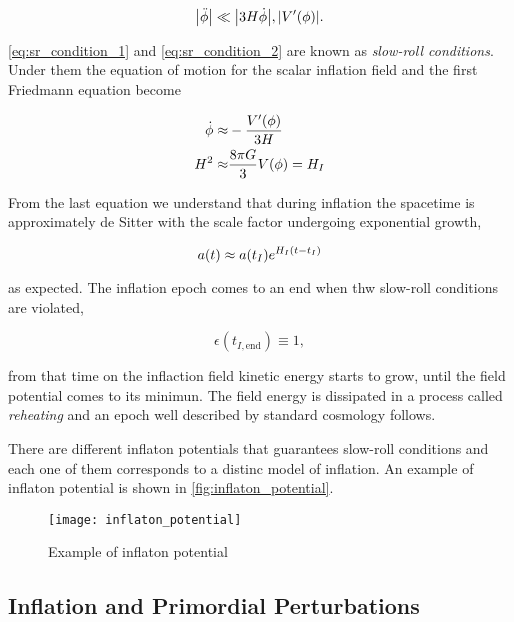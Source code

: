 \begin{equation}
        \abs{\ddot\phi} \ll \abs{3H\dot\phi}, \abs{V'\qty(\phi)}.
        \label{eq:sr_condition_2}
\end{equation}

\autoref{eq:sr_condition_1} and \autoref{eq:sr_condition_2} are known as
\emph{slow-roll conditions}. Under them the equation of motion for the
scalar inflation field and the first Friedmann equation become

\begin{align}
        \dot\phi \approx & -\frac{V'\qty(\phi)}{3H}  \\
        H^2 \approx & \frac{8\pi G}{3} V\qty(\phi) = H_I
\end{align}

From the last equation we understand that during inflation the spacetime is
approximately de Sitter with the scale factor undergoing exponential growth,

\begin{equation}
        a\qty(t) \approx a\qty(t_I)e^{H_I\qty(t - t_I)}
\end{equation}

as expected. The inflation epoch comes to an end when thw slow-roll
conditions are violated,

\begin{equation}
        \epsilon(t_{I,\text{end}}) \equiv 1,
\end{equation}

from that time on the inflaction field kinetic energy starts to grow,
until the field potential comes to its minimun. The field energy is
dissipated in a process called \emph{reheating} and an epoch well
described by standard cosmology follows.

There are different inflaton potentials that guarantees slow-roll
conditions and each one of them corresponds to a distinc model of
inflation. An example of inflaton potential is shown in
\autoref{fig:inflaton_potential}.

\begin{figure}
        \centering
        \texttt{[image: inflaton\_potential]}
        \caption{Example of inflaton potential}
        \label{fig:inflaton_potential}
\end{figure}

\subsection{Inflation and Primordial Perturbations}

